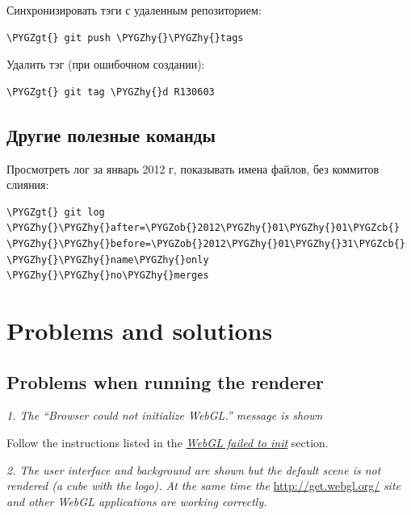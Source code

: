 \documentclass[a4paper,12pt,oneside]{sphinxmanual}
\def\PYGZob{\char`\{}
\def\PYGZcb{\char`\}}
\def\PYGZgt{\char`\>}
\def\PYGZhy{\char`\-}
\begin{document}
Синхронизировать тэги с удаленным репозиторием:

\begin{Verbatim}[commandchars=\\\{\}]
\PYGZgt{} git push \PYGZhy{}\PYGZhy{}tags
\end{Verbatim}

Удалить тэг (при ошибочном создании):

\begin{Verbatim}[commandchars=\\\{\}]
\PYGZgt{} git tag \PYGZhy{}d R130603
\end{Verbatim}


\section{Другие полезные команды}
\label{git_short_manual:id20}
Просмотреть лог за январь 2012 г, показывать имена файлов, без коммитов слияния:

\begin{Verbatim}[commandchars=\\\{\}]
\PYGZgt{} git log \PYGZhy{}\PYGZhy{}after=\PYGZob{}2012\PYGZhy{}01\PYGZhy{}01\PYGZcb{} \PYGZhy{}\PYGZhy{}before=\PYGZob{}2012\PYGZhy{}01\PYGZhy{}31\PYGZcb{} \PYGZhy{}\PYGZhy{}name\PYGZhy{}only \PYGZhy{}\PYGZhy{}no\PYGZhy{}merges
\end{Verbatim}


\chapter{Problems and solutions}
\label{problems_and_solutions:problems-and-solutions}\label{problems_and_solutions::doc}\label{problems_and_solutions:id1}

\section{Problems when running the renderer}
\label{problems_and_solutions:id2}\label{problems_and_solutions:renderer-not-working}
\emph{1. The ``Browser could not initialize WebGL.'' message is shown}

Follow the instructions listed in the {\hyperref[problems_and_solutions:webgl-not-working]{\emph{WebGL failed to init}}} section.

\emph{2. The user interface and background are shown but the default scene is not rendered (a cube with the logo). At the same time the} \href{http://get.webgl.org/}{http://get.webgl.org/} \emph{site and other WebGL applications are working correctly.}
\end{document}

